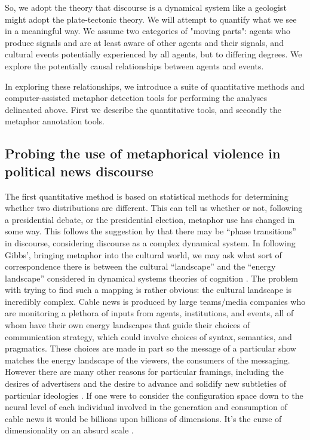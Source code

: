 So, we adopt
the theory that discourse is a dynamical system like a geologist might adopt
the plate-tectonic theory. We will attempt to quantify what we see in a
meaningful way. We assume two categories of "moving parts": agents who 
produce signals and are at least aware of other agents and their signals, and
cultural events potentially experienced by all agents, but to differing
degrees. We explore the potentially causal relationships between agents and
events. 

In exploring these relationships, we introduce a suite of quantitative 
methods and computer-assisted metaphor detection tools for 
performing the analyses delineated above. First we describe the quantitative
tools, and secondly the metaphor annotation tools. 

\subsection{Probing the use of metaphorical violence in political news discourse}
\label{sub:Analytical-tools}

The first quantitative method is based on statistical 
methods for determining whether two distributions are different. This can tell
us whether or not, following a presidential debate, or the presidential 
election, metaphor use has changed in some way. This follows the suggestion by
 that
there may be ``phase transitions'' in discourse, considering discourse as 
a complex dynamical system. In following Gibbs', bringing metaphor into the
cultural world, we may ask what sort of correspondence there is between the
cultural ``landscape'' and the ``energy landscape'' considered in dynamical
systems theories of cognition \cite{Spivey2007}. The problem with trying to
find such a mapping is rather obvious: the cultural landscape is incredibly
complex. Cable news is produced by large teams/media companies who are 
monitoring a plethora of inputs from agents, institutions, and events, all of
whom have their own energy landscapes that guide their choices of communication
strategy, which could involve choices of syntax, semantics, and pragmatics.
These choices are made in part so the message of a particular show matches
the energy landscape of the viewers, the consumers of the messaging. However
there are many other reasons for particular framings, including the desires
of advertisers and the desire to advance and solidify new subtleties of
particular ideologies \cite{Prior2013}. If one were to consider the 
configuration space down to the neural level of each individual involved in
the generation and consumption of cable news it would be billions upon billions
of dimensions. It's the curse of dimensionality on an absurd scale \cite{Shultz2011}. 

